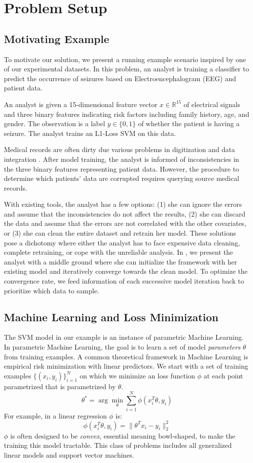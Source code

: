 \section{Problem Setup}
\subsection{Motivating Example}
To motivate our solution, we present a running example scenario inspired by
one of our experimental datasets.
In this problem, an analyst is training a classifier to predict the occurrence 
of seizures based on Electroencephalogram (EEG) and patient data.
\begin{example}
An analyst is given a 15-dimensional feature vector $x \in \mathbb{R}^{15}$ of electrical signals and three binary features indicating risk factors including family history, age, and gender.
The observation is a label $y\in \{0,1\}$ of whether the patient is having a seizure.
The analyst trains an L1-Loss SVM on this data.

Medical records are often dirty due various problems in digitization and data integration \cite{fortunearticle}.
After model training, the analyst is informed of inconsistencies in the three binary features representing patient data.
However, the procedure to determine which patients' data are corrupted requires querying source medical records.
\end{example}
With existing tools, the analyst has a few options: (1) she can ignore the errors and assume that the inconsistencies do not affect the results, (2) she can discard the data and assume that the errors are not correlated with the other covariates, or (3) she can clean the entire dataset and retrain her model.
These solutions pose a dichotomy where either the analyst has to face expensive data cleaning, complete retraining, or cope with the unreliable analysis.
In \sys, we present the analyst with a middle ground where she can initialize the framework with her existing model and iteratively converge towards the clean model.
To optimize the convergence rate, we feed information of each successive model iteration back to prioritize which data to sample.

\subsection{Machine Learning and Loss Minimization}
The SVM model in our example is an instance of parametric Machine Learning.
In parametric Machine Learning, the goal is to learn a set of model \emph{parameters} $\theta$ from training examples.
A common theoretical framework in Machine Learning is empirical risk minimization with linear predictors.
We start with a set of training examples $\{(x_{i},y_{i})\}_{i=1}^{N}$
on which we minimize an loss function $\phi$ at each point parametrized that is parametrized by $\theta$.
\[
 \theta^{*}=\arg\min_{\theta}\sum_{i=1}^{N}\phi(x_{i}^T\theta,y_{i})
\]
For example, in a linear regression $\phi$ is:
\[
\phi(x_{i}^T\theta,y_{i}) = \|\theta^Tx_{i} - y_i \|_2^2
\]
$\phi$ is often designed to be \emph{convex}, essential meaning bowl-shaped, to make the training this model 
tractable.
This class of problems includes all generalized linear models and support vector machines.

